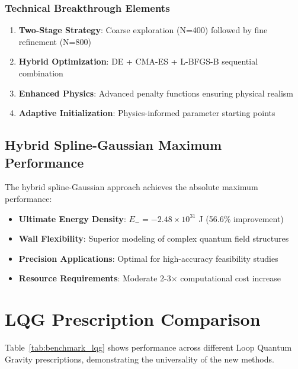 \documentclass[12pt]{article}
\begin{document}
\subsubsection{Technical Breakthrough Elements}

\begin{enumerate}
\item \textbf{Two-Stage Strategy}: Coarse exploration (N=400) followed by fine refinement (N=800)
\item \textbf{Hybrid Optimization}: DE + CMA-ES + L-BFGS-B sequential combination
\item \textbf{Enhanced Physics}: Advanced penalty functions ensuring physical realism
\item \textbf{Adaptive Initialization}: Physics-informed parameter starting points
\end{enumerate}

\subsection{Hybrid Spline-Gaussian Maximum Performance}

The hybrid spline-Gaussian approach achieves the absolute maximum performance:

\begin{itemize}
\item \textbf{Ultimate Energy Density}: $E_- = -2.48\times10^{31}$ J (56.6\% improvement)
\item \textbf{Wall Flexibility}: Superior modeling of complex quantum field structures
\item \textbf{Precision Applications}: Optimal for high-accuracy feasibility studies
\item \textbf{Resource Requirements}: Moderate 2-3× computational cost increase
\end{itemize}

\section{LQG Prescription Comparison}

Table~\ref{tab:benchmark_lqg} shows performance across different Loop Quantum Gravity prescriptions, demonstrating the universality of the new methods.
\end{document}
